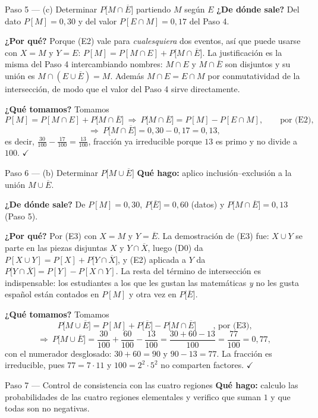 \documentclass[11pt]{article}
\begin{document}
\begin{sol}
\begin{paso}{Paso 5 --- (c) Determinar $P\big[M\cap\overline{E}\big]$ partiendo $M$ según $E$}
\textbf{¿De dónde sale?} Del dato $P[M]=0{,}30$ y del valor $P[E\cap M]=0{,}17$ del Paso 4.

\textbf{¿Por qué?} Porque (E2) vale para \emph{cualesquiera} dos eventos, así que puede usarse
con $X=M$ y $Y=E$: $P[M]=P[M\cap E]+P\big[M\cap\overline{E}\big]$. La justificación es la misma
del Paso 4 intercambiando nombres: $M\cap E$ y $M\cap\overline{E}$ son disjuntos y su unión es
$M\cap(E\cup\overline{E})=M$. Además $M\cap E=E\cap M$ por conmutatividad de la intersección, de
modo que el valor del Paso 4 sirve directamente.

\textbf{¿Qué tomamos?} Tomamos
\[
P[M]=P[M\cap E]+P\big[M\cap\overline{E}\big]
\ \Longrightarrow\ P\big[M\cap\overline{E}\big]=P[M]-P[E\cap M] , \qquad\text{por (E2),}
\]
\[
\Longrightarrow\ P\big[M\cap\overline{E}\big]=0{,}30-0{,}17=0{,}13 ,
\]
es decir, $\frac{30}{100}-\frac{17}{100}=\frac{13}{100}$, fracción ya irreducible porque $13$ es
primo y no divide a $100$. $\checkmark$
\end{paso}

\begin{paso}{Paso 6 --- (b) Determinar $P\big[M\cup\overline{E}\big]$}
\textbf{Qué hago:} aplico inclusión--exclusión a la unión $M\cup\overline{E}$.

\textbf{¿De dónde sale?} De $P[M]=0{,}30$, $P\big[\overline{E}\big]=0{,}60$ (datos) y
$P\big[M\cap\overline{E}\big]=0{,}13$ (Paso 5).

\textbf{¿Por qué?} Por (E3) con $X=M$ y $Y=\overline{E}$. La demostración de (E3) fue:
$X\cup Y$ se parte en las piezas disjuntas $X$ y $Y\cap\overline{X}$, luego (D0) da
$P[X\cup Y]=P[X]+P\big[Y\cap\overline{X}\big]$, y (E2) aplicada a $Y$ da
$P\big[Y\cap\overline{X}\big]=P[Y]-P[X\cap Y]$. La resta del término de intersección es
indispensable: los estudiantes a los que les gustan las matemáticas \emph{y} no les gusta
español están contados en $P[M]$ y otra vez en $P\big[\overline{E}\big]$.

\textbf{¿Qué tomamos?} Tomamos
\[
P\big[M\cup\overline{E}\big]=P[M]+P\big[\overline{E}\big]-P\big[M\cap\overline{E}\big]
\qquad\text{, por (E3),}
\]
\[
\Longrightarrow\ P\big[M\cup\overline{E}\big]=\frac{30}{100}+\frac{60}{100}-\frac{13}{100}
=\frac{30+60-13}{100}=\frac{77}{100}=0{,}77 ,
\]
con el numerador desglosado: $30+60=90$ y $90-13=77$. La fracción es irreducible, pues
$77=7\cdot 11$ y $100=2^{2}\cdot 5^{2}$ no comparten factores. $\checkmark$
\end{paso}

\begin{paso}{Paso 7 --- Control de consistencia con las cuatro regiones}
\textbf{Qué hago:} calculo las probabilidades de las cuatro regiones elementales y verifico que
suman $1$ y que todas son no negativas.


\end{paso}
\end{sol}
\end{document}
